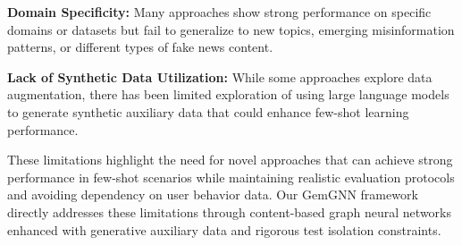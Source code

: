 \textbf{Domain Specificity:} Many approaches show strong performance on specific domains or datasets but fail to generalize to new topics, emerging misinformation patterns, or different types of fake news content.

\textbf{Lack of Synthetic Data Utilization:} While some approaches explore data augmentation, there has been limited exploration of using large language models to generate synthetic auxiliary data that could enhance few-shot learning performance.

These limitations highlight the need for novel approaches that can achieve strong performance in few-shot scenarios while maintaining realistic evaluation protocols and avoiding dependency on user behavior data. Our GemGNN framework directly addresses these limitations through content-based graph neural networks enhanced with generative auxiliary data and rigorous test isolation constraints.

\EndChapter
